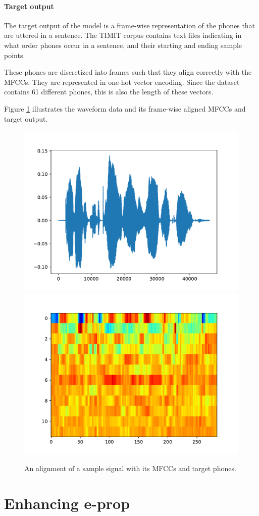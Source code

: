 		\paragraph{Target output}

			The target output of the model is a frame-wise representation of the phones that are uttered in a sentence.
			The TIMIT corpus contains text files indicating in what order phones occur in a sentence, and their starting and ending sample points.

			These phones are discretized into frames such that they align correctly with the MFCCs.
			They are represented in one-hot vector encoding.
			Since the dataset contains 61 different phones, this is also the length of these vectors.

			Figure \ref{fig:source_mfcc_target} illustrates the waveform data and its frame-wise aligned MFCCs and target output.




		\begin{figure}[ht]
		    \centering
		    \includegraphics[width=.45\linewidth]{gfx/signal}\\
		    \includegraphics[width=.45\linewidth]{gfx/mfcc}\\
		    \label{fig:source_mfcc_target}
		    \caption{An alignment of a sample signal with its MFCCs and target phones.}
		\end{figure}

\section{Enhancing e-prop}

